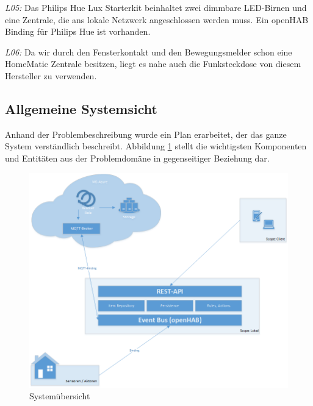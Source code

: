 \textit{L05:} Das Philips Hue Lux Starterkit beinhaltet zwei dimmbare LED-Birnen und eine Zentrale, die ans lokale Netzwerk angeschlossen werden muss. Ein openHAB Binding für Philips Hue ist vorhanden.

\textit{L06:} Da wir durch den Fensterkontakt und den Bewegungsmelder schon eine HomeMatic Zentrale besitzen, liegt es nahe auch die Funksteckdose von diesem Hersteller zu verwenden.



\subsection{Allgemeine Systemsicht}
Anhand der Problembeschreibung wurde ein Plan erarbeitet, der das ganze System verständlich beschreibt. Abbildung \ref{fig:systemView} stellt die wichtigsten Komponenten und Entitäten aus der Problemdomäne in gegenseitiger Beziehung dar.

\begin{figure}[h!]
	\centering
		\includegraphics[scale=0.55]{report/img/systemuebersicht}
	\caption{Systemübersicht}
	\label{fig:systemView}
\end{figure}

\pagebreak